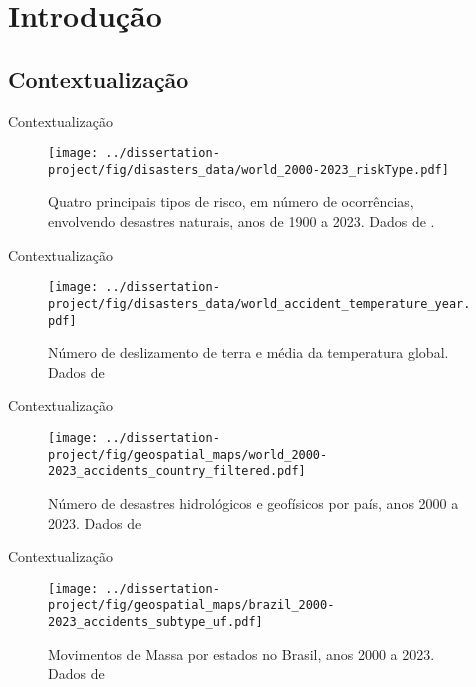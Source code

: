 \section{Introdução}

\subsection{Contextualização}

\begin{frame}{Contextualização}
    \begin{figure}
        \centering
        \texttt{[image: ../dissertation-project/fig/disasters\_data/world\_2000-2023\_riskType.pdf]}
        \caption{Quatro principais tipos de risco, em número de ocorrências, envolvendo
        desastres naturais, anos de 1900 a 2023. Dados de \cite{emdat_2023}.}
    \end{figure}
\end{frame}


\begin{frame}{Contextualização}
    \begin{figure}
        \centering
        \texttt{[image: ../dissertation-project/fig/disasters\_data/world\_accident\_temperature\_year.pdf]}
        \caption{Número de deslizamento de terra e média da temperatura global. Dados de \cite{emdat_2023,NASA/GISS}}
    \end{figure}
\end{frame}

\begin{frame}{Contextualização}
    \begin{figure}
        \centering
        \texttt{[image: ../dissertation-project/fig/geospatial\_maps/world\_2000-2023\_accidents\_country\_filtered.pdf]}
        \caption{Número de desastres hidrológicos e geofísicos por país, anos 2000 a 2023. Dados de \cite{emdat_2023}}
    \end{figure}
\end{frame}

\begin{frame}{Contextualização}
    \begin{figure}
        \centering
        \texttt{[image: ../dissertation-project/fig/geospatial\_maps/brazil\_2000-2023\_accidents\_subtype\_uf.pdf]}
        \caption{Movimentos de Massa por estados no Brasil, anos 2000 a 2023. Dados de \cite{emdat_2023}}
    \end{figure}
\end{frame}

